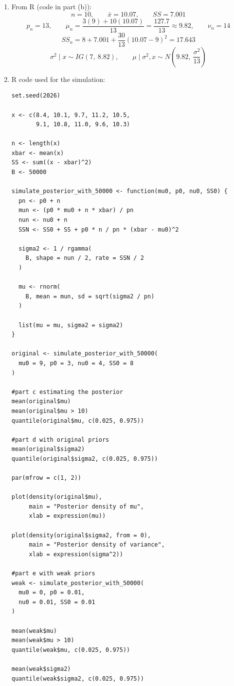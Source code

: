 \documentclass[11pt]{article}
\begin{document}
\begin{enumerate}
\item From R (code in part (b)):
\[
\boxed{n = 10, \qquad \bar{x} = 10.07, \qquad SS = 7.001}
\]
\[
p_n = 13, \qquad \mu_n = \frac{3(9) + 10(10.07)}{13} = \frac{127.7}{13} \approx 9.82, \qquad \nu_n = 14
\]
\[
SS_n = 8 + 7.001 + \frac{30}{13}(10.07 - 9)^2 = 17.643
\]
\[
\boxed{\sigma^2 \mid x \sim IG(7,\ 8.82)}, \qquad \boxed{\mu \mid \sigma^2, x \sim N\left(9.82,\ \frac{\sigma^2}{13}\right)}
\]

\item R code used for the simulation:
\begin{lstlisting}
set.seed(2026)

x <- c(8.4, 10.1, 9.7, 11.2, 10.5,
       9.1, 10.8, 11.0, 9.6, 10.3)

n <- length(x)
xbar <- mean(x)
SS <- sum((x - xbar)^2)
B <- 50000

simulate_posterior_with_50000 <- function(mu0, p0, nu0, SS0) {
  pn <- p0 + n
  mun <- (p0 * mu0 + n * xbar) / pn
  nun <- nu0 + n
  SSN <- SS0 + SS + p0 * n / pn * (xbar - mu0)^2

  sigma2 <- 1 / rgamma(
    B, shape = nun / 2, rate = SSN / 2
  )

  mu <- rnorm(
    B, mean = mun, sd = sqrt(sigma2 / pn)
  )

  list(mu = mu, sigma2 = sigma2)
}

original <- simulate_posterior_with_50000(
  mu0 = 9, p0 = 3, nu0 = 4, SS0 = 8
)

#part c estimating the posterior
mean(original$mu)
mean(original$mu > 10)
quantile(original$mu, c(0.025, 0.975))

#part d with original priors
mean(original$sigma2)
quantile(original$sigma2, c(0.025, 0.975))

par(mfrow = c(1, 2))

plot(density(original$mu),
     main = "Posterior density of mu",
     xlab = expression(mu))

plot(density(original$sigma2, from = 0),
     main = "Posterior density of variance",
     xlab = expression(sigma^2))

#part e with weak priors
weak <- simulate_posterior_with_50000(
  mu0 = 0, p0 = 0.01,
  nu0 = 0.01, SS0 = 0.01
)

mean(weak$mu)
mean(weak$mu > 10)
quantile(weak$mu, c(0.025, 0.975))

mean(weak$sigma2)
quantile(weak$sigma2, c(0.025, 0.975))
\end{lstlisting}


\end{enumerate}
\end{document}
